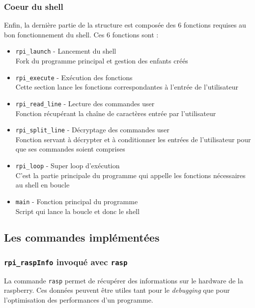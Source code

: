 \documentclass[10pt,a4paper]{article}
\begin{document}
\subsubsection{Coeur du shell}
Enfin, la dernière partie de la structure est composée des 6 fonctions requises au bon fonctionnement du shell. Ces 6 fonctions sont : 
\begin{itemize}
\item \texttt{rpi\_launch} - Lancement du shell\\
Fork du programme principal et gestion des enfants créés

\item \texttt{rpi\_execute} - Exécution des fonctions\\
Cette section lance les fonctions correspondantes à l'entrée de l'utilisateur

\item \texttt{rpi\_read\_line} - Lecture des commandes user\\
Fonction récupérant la chaîne de caractères entrée par l'utilisateur

\item \texttt{rpi\_split\_line} - Décryptage des commandes user\\
Fonction servant à décrypter et à conditionner les entrées de l'utilisateur pour que ses commandes soient comprises

\item \texttt{rpi\_loop} - Super loop d'exécution\\
C'est la partie principale du programme qui appelle les fonctions nécessaires au shell en boucle

\item \texttt{main} - Fonction principal du programme\\
Script qui lance la boucle et donc le shell 
\end{itemize}

\subsection{Les commandes implémentées}
\subsubsection{\texttt{rpi\_raspInfo} invoqué avec \texttt{rasp}}
La commande \texttt{rasp} permet de récupérer des informations sur le hardware de la raspberry. Ces données peuvent être utiles tant pour le \textit{debugging} que pour l'optimisation des performances d'un programme.\\
\end{document}
